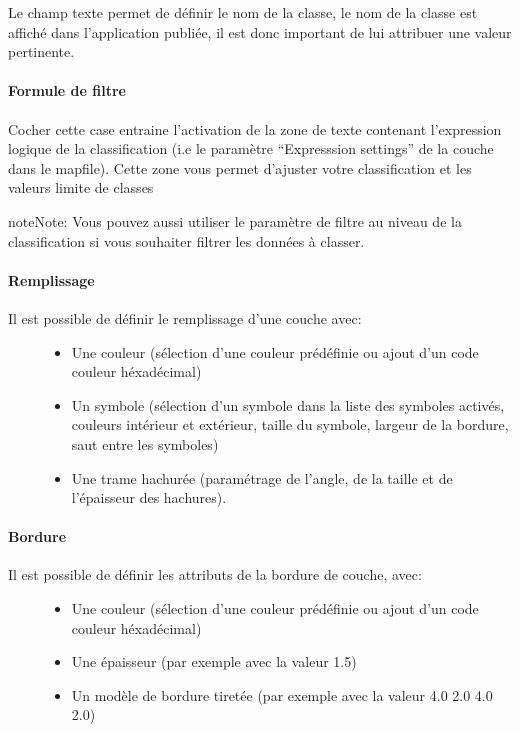\documentclass[letterpaper,10pt,french]{sphinxmanual}
\begin{document}
Le champ texte permet de définir le nom de la classe, le nom de la
classe est affiché dans l'application publiée, il est donc important
de lui attribuer une valeur pertinente.
\paragraph{Formule de filtre}

Cocher cette case entraine l'activation de la zone de texte contenant
l'expression logique de la classification (i.e le paramètre
``Expresssion settings'' de la couche dans le mapfile). Cette zone vous
permet d'ajuster votre classification et les valeurs limite de
classes

\begin{notice}{note}{Note:}
Vous pouvez aussi utiliser le paramètre de filtre au niveau de la
classification si vous souhaiter filtrer les données à classer.
\end{notice}
\paragraph{Remplissage}
\begin{description}
\item[{Il est possible de définir le remplissage d'une couche avec:}] \leavevmode\begin{itemize}
\item {} 
Une couleur (sélection d'une couleur prédéfinie ou ajout d'un code couleur héxadécimal)

\item {} 
Un symbole (sélection d'un symbole dans la liste des symboles activés, couleurs intérieur et extérieur, taille du symbole, largeur de la bordure, saut entre les symboles)

\item {} 
Une trame hachurée (paramétrage de l'angle, de la taille et de l'épaisseur des hachures).

\end{itemize}

\end{description}
\paragraph{Bordure}
\begin{description}
\item[{Il est possible de définir les attributs de la bordure de couche, avec:}] \leavevmode\begin{itemize}
\item {} 
Une couleur (sélection d'une couleur prédéfinie ou ajout d'un code couleur héxadécimal)

\item {} 
Une épaisseur (par exemple avec la valeur 1.5)

\item {} 
Un modèle de bordure tiretée (par exemple avec la valeur 4.0 2.0 4.0 2.0)

\end{itemize}

\end{description}
\end{document}
